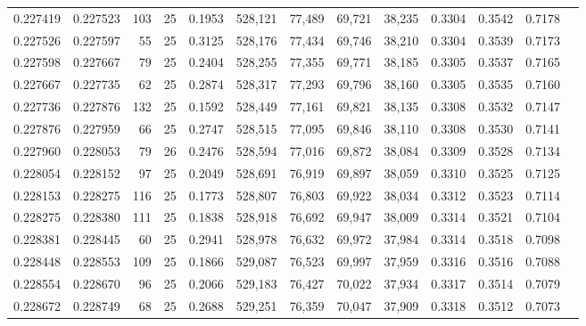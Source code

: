 \begin{tabular}{rrrrrrrrrrrrr}
0.227419 & 0.227523 &   103 &  25 &                                     0.1953 & 528,121 &  77,489 &  69,721 &  38,235 & 0.3304 & 0.3542 & 0.7178 \\
0.227526 & 0.227597 &    55 &  25 &                                     0.3125 & 528,176 &  77,434 &  69,746 &  38,210 & 0.3304 & 0.3539 & 0.7173 \\
0.227598 & 0.227667 &    79 &  25 &                                     0.2404 & 528,255 &  77,355 &  69,771 &  38,185 & 0.3305 & 0.3537 & 0.7165 \\
0.227667 & 0.227735 &    62 &  25 &                                     0.2874 & 528,317 &  77,293 &  69,796 &  38,160 & 0.3305 & 0.3535 & 0.7160 \\
0.227736 & 0.227876 &   132 &  25 &                                     0.1592 & 528,449 &  77,161 &  69,821 &  38,135 & 0.3308 & 0.3532 & 0.7147 \\
0.227876 & 0.227959 &    66 &  25 &                                     0.2747 & 528,515 &  77,095 &  69,846 &  38,110 & 0.3308 & 0.3530 & 0.7141 \\
0.227960 & 0.228053 &    79 &  26 &                                     0.2476 & 528,594 &  77,016 &  69,872 &  38,084 & 0.3309 & 0.3528 & 0.7134 \\
0.228054 & 0.228152 &    97 &  25 &                                     0.2049 & 528,691 &  76,919 &  69,897 &  38,059 & 0.3310 & 0.3525 & 0.7125 \\
0.228153 & 0.228275 &   116 &  25 &                                     0.1773 & 528,807 &  76,803 &  69,922 &  38,034 & 0.3312 & 0.3523 & 0.7114 \\
0.228275 & 0.228380 &   111 &  25 &                                     0.1838 & 528,918 &  76,692 &  69,947 &  38,009 & 0.3314 & 0.3521 & 0.7104 \\
0.228381 & 0.228445 &    60 &  25 &                                     0.2941 & 528,978 &  76,632 &  69,972 &  37,984 & 0.3314 & 0.3518 & 0.7098 \\
0.228448 & 0.228553 &   109 &  25 &                                     0.1866 & 529,087 &  76,523 &  69,997 &  37,959 & 0.3316 & 0.3516 & 0.7088 \\
0.228554 & 0.228670 &    96 &  25 &                                     0.2066 & 529,183 &  76,427 &  70,022 &  37,934 & 0.3317 & 0.3514 & 0.7079 \\
0.228672 & 0.228749 &    68 &  25 &                                     0.2688 & 529,251 &  76,359 &  70,047 &  37,909 & 0.3318 & 0.3512 & 0.7073 \\

\end{tabular}
